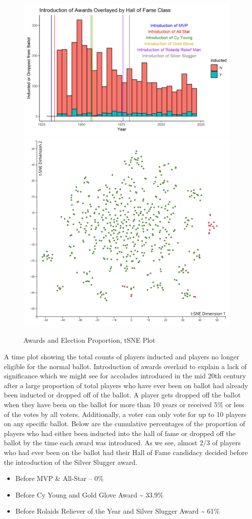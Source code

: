 \documentclass[
]{article}
\providecommand{\tightlist}{%
  \setlength{\itemsep}{0pt}\setlength{\parskip}{0pt}}
\begin{document}
\begin{figure}

{\centering \includegraphics[width=0.49\linewidth,height=0.2\textheight]{../Plots/award_eda} \includegraphics[width=0.49\linewidth,height=0.2\textheight]{../Plots/steroids} 

}

\caption{Awards and Election Proportion, tSNE Plot}\label{fig:unnamed-chunk-2}
\end{figure}

A time plot showing the total counts of players inducted and players no
longer eligible for the normal ballot. Introduction of awards overlaid
to explain a lack of significance which we might see for accolades
introduced in the mid 20th century after a large proportion of total
players who have ever been on ballot had already been inducted or
dropped off of the ballot. A player gets dropped off the ballot when
they have been on the ballot for more than 10 years or received 5\% or
less of the votes by all voters. Additionally, a voter can only vote for
up to 10 players on any specific ballot. Below are the cumulative
percentages of the proportion of players who had either been inducted
into the hall of fame or dropped off the ballot by the time each award
was introduced. As we see, almost 2/3 of players who had ever been on
the ballot had their Hall of Fame candidacy decided before the
introduction of the Silver Slugger award.

\begin{itemize}
\tightlist
\item
  Before MVP \& All-Star -- 0\%
\item
  Before Cy Young and Gold Glove Award \textasciitilde{} 33.9\%
\item
  Before Rolaids Reliever of the Year and Silver Slugger Award
  \textasciitilde{} 61\%
\end{itemize}
\end{document}
